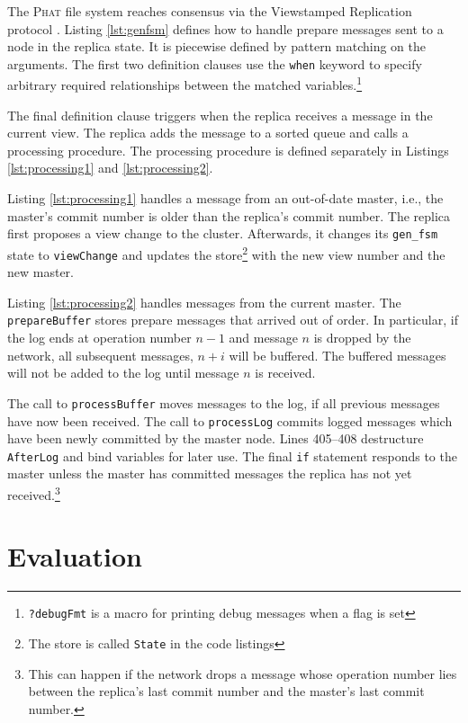 \documentclass[10pt,letter]{article}
\newcommand{\phat}[0]{\textsc{Phat}}
\begin{document}
The \phat{} file system reaches consensus via the Viewstamped Replication
protocol \cite{liskov2012viewstamped}. Listing \ref{lst:genfsm} defines how to
handle prepare messages sent to a node in the replica state. It is piecewise
defined by pattern matching on the arguments. The first two definition clauses
use the \lstinline!when! keyword to specify arbitrary required relationships
between the matched variables.\footnote{\lstinline{?debugFmt} is a macro
    for printing debug messages when a flag is set}

The final definition clause triggers when the replica receives a message in the
current view. The replica adds the message to a sorted queue and calls a
processing procedure. The processing procedure is defined separately in Listings
\ref{lst:processing1} and \ref{lst:processing2}.

Listing \ref{lst:processing1} handles a message from an out-of-date master,
i.e., the master's commit number is older than the replica's commit number. The
replica first proposes a view change to the cluster. Afterwards, it changes its
\texttt{gen\_fsm} state to \lstinline!viewChange! and updates the
store\footnote{The store is called \lstinline!State! in the code listings} with
the new view number and the new master.

Listing \ref{lst:processing2} handles messages from the current master. The
\lstinline!prepareBuffer! stores prepare messages that arrived out of order. In
particular, if the log ends at operation number $n-1$ and message $n$ is dropped
by the network, all subsequent messages, $n+i$ will be buffered. The buffered
messages will not be added to the log until message $n$ is received.

The call to \lstinline!processBuffer! moves messages to the log, if all previous
messages have now been received. The call to \lstinline!processLog! commits
logged messages which have been newly committed by the master node. Lines
405--408 destructure \lstinline!AfterLog! and bind variables for later use. The
final \lstinline!if! statement responds to the master unless the master has
committed messages the replica has not yet received.\footnote{This can happen if the
  network drops a message whose operation number lies between the replica's last
  commit number and the master's last commit number.}

\section{Evaluation}
\end{document}

